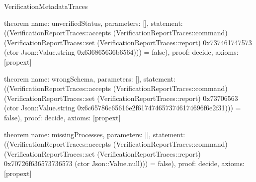 \begin{lexlean}{VerificationMetadataTraces}
\begin{semanticmodule}
theorem{
  name: unverifiedStatus,
  parameters: [],
  statement: ((VerificationReportTraces::accepts (VerificationReportTraces::command) (VerificationReportTraces::set (VerificationReportTraces::report) 0x737461747573 (ctor Json::Value.string 0x636865636b6564))) = false),
  proof: decide{},
  axioms: [propext]
}

theorem{
  name: wrongSchema,
  parameters: [],
  statement: ((VerificationReportTraces::accepts (VerificationReportTraces::command) (VerificationReportTraces::set (VerificationReportTraces::report) 0x73706563 (ctor Json::Value.string 0x6c65786c65616e2f6174746573746174696f6e2f31))) = false),
  proof: decide{},
  axioms: [propext]
}

theorem{
  name: missingProcesses,
  parameters: [],
  statement: ((VerificationReportTraces::accepts (VerificationReportTraces::command) (VerificationReportTraces::set (VerificationReportTraces::report) 0x70726f636573736573 (ctor Json::Value.null))) = false),
  proof: decide{},
  axioms: [propext]
}
















\end{semanticmodule}
\end{lexlean}
